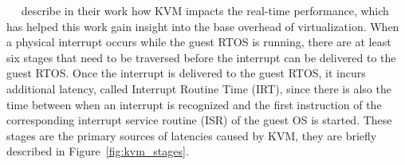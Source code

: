 \documentclass[MMR,Master,english]{twbook}
\begin{document}
\bigskip \noindent \citeauthor{maPerformanceTuningKVMbased}~\cite{maPerformanceTuningKVMbased}~\cite{junzhangPerformanceAnalysisKVMBased2010} describe in their work how KVM impacts the real-time performance, which has helped this work gain insight into the base overhead of virtualization. When a physical interrupt occurs while the guest RTOS is running, there are at least six stages that need to be traversed before the interrupt can be delivered to the guest RTOS. Once the interrupt is delivered to the guest RTOS, it incurs additional latency, called Interrupt Routine Time (IRT), since there is also the time between when an interrupt is recognized and the first instruction of the corresponding interrupt service routine (ISR) of the guest OS is started. These stages are the primary sources of latencies caused by KVM, they are briefly described in Figure~\ref{fig:kvm_stages}.
\vspace{2em}
\end{document}
